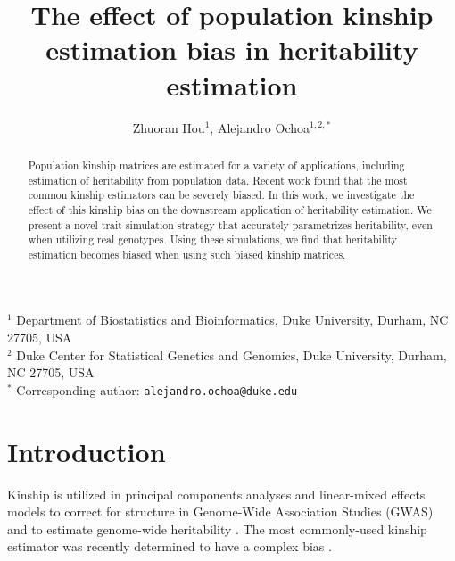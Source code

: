 \documentclass[11pt]{article}
\title{\Large \textbf{The effect of population kinship estimation bias in heritability estimation}}
\author{Zhuoran Hou$^1$, Alejandro Ochoa$^{1,2,*}$}
\date{}
\begin{document}
\maketitle

\noindent
$^1$ Department of Biostatistics and Bioinformatics, Duke University, Durham, NC 27705, USA \\
$^2$ Duke Center for Statistical Genetics and Genomics, Duke University, Durham, NC 27705, USA \\
$^*$ Corresponding author: \texttt{alejandro.ochoa@duke.edu}


\begin{abstract}
  Population kinship matrices are estimated for a variety of applications, including estimation of heritability from population data.
  Recent work found that the most common kinship estimators can be severely biased.
  In this work, we investigate the effect of this kinship bias on the downstream application of heritability estimation.
  We present a novel trait simulation strategy that accurately parametrizes heritability, even when utilizing real genotypes.
  Using these simulations, we find that heritability estimation becomes biased when using such biased kinship matrices.
\end{abstract}



\clearpage
	
\section{Introduction}

Kinship is utilized in principal components analyses and linear-mixed effects models to correct for structure in Genome-Wide Association Studies (GWAS) \citep{xie_combining_1998,yu_unified_2006, aulchenko_genomewide_2007, price_principal_2006, astle_population_2009,kang_efficient_2008, kang_variance_2010, zhou_genome-wide_2012, loh_efficient_2015, sul_population_2018} and to estimate genome-wide heritability \citep{yang_common_2010, yang_gcta:_2011, speed_improved_2012}.
The most commonly-used kinship estimator \citep{price_principal_2006, astle_population_2009, rakovski_kinship-based_2009, thornton_roadtrips:_2010, yang_common_2010, yang_gcta:_2011, zhou_genome-wide_2012, speed_improved_2012, speed_relatedness_2015, loh_efficient_2015, wang_efficient_2017, sul_population_2018} was recently determined to have a complex bias \citep{ochoa_estimating_2021, weir_unified_2017}.
\end{document}
